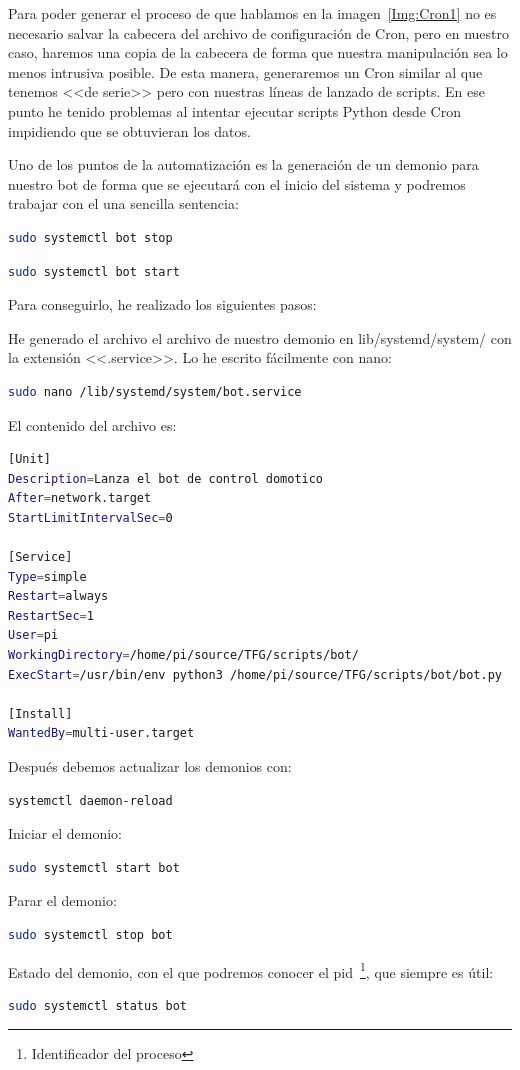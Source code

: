Para poder generar el proceso de que hablamos en la imagen~\ref{Img:Cron1} no es necesario salvar la cabecera del archivo de configuración de Cron, pero en nuestro caso, haremos una copia de la cabecera de forma que nuestra manipulación sea lo menos intrusiva posible. De esta manera, generaremos un Cron similar al que tenemos <<de serie>> pero con nuestras líneas de lanzado de scripts.
En ese punto he tenido problemas al intentar ejecutar scripts Python desde Cron impidiendo que se obtuvieran los datos.

Uno de los puntos de la automatización es la generación de un demonio para nuestro bot de forma que se ejecutará con el inicio del sistema y podremos trabajar con el una sencilla sentencia:

\begin{lstlisting}[language=sh,firstnumber=0]
sudo systemctl bot stop
\end{lstlisting}
\begin{lstlisting}[language=sh]
sudo systemctl bot start 
\end{lstlisting}
Para conseguirlo, he realizado los siguientes pasos:

He generado el archivo el archivo de nuestro demonio en lib/systemd/system/ con la extensión <<.service>>. Lo he escrito fácilmente con nano: 
\begin{lstlisting}[language=sh, firstnumber=0]
sudo nano /lib/systemd/system/bot.service
\end{lstlisting}
El contenido del archivo es:
\begin{lstlisting}[language=sh, caption={Modificaciones en el archivo /lib/systemd/system/bot.service.}, firstnumber=0]
[Unit]
Description=Lanza el bot de control domotico
After=network.target
StartLimitIntervalSec=0

[Service]
Type=simple
Restart=always
RestartSec=1
User=pi
WorkingDirectory=/home/pi/source/TFG/scripts/bot/
ExecStart=/usr/bin/env python3 /home/pi/source/TFG/scripts/bot/bot.py

[Install]
WantedBy=multi-user.target
\end{lstlisting}
Después debemos actualizar los demonios con: 
\begin{lstlisting}[language=sh, firstnumber=0]
systemctl daemon-reload
\end{lstlisting}
Iniciar el demonio: 
\begin{lstlisting}[language=sh, firstnumber=0]
sudo systemctl start bot
\end{lstlisting}
Parar el demonio: 
\begin{lstlisting}[language=sh, firstnumber=0]
sudo systemctl stop bot
\end{lstlisting}
Estado del demonio, con el que podremos conocer el pid~\footnote{Identificador del proceso}, que siempre es útil: 
\begin{lstlisting}[language=sh, firstnumber=0]
sudo systemctl status bot
\end{lstlisting}

